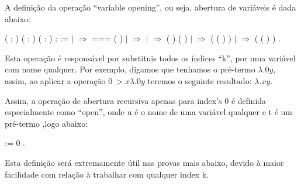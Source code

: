 A definição da operação ``variable opening'', ou seja, abertura de variáveis é dada abaixo:\begin{coqdoccode}
\coqdocemptyline
\coqdocnoindent
{}  ( : ) ( : ) ( : ) :  :=\coqdoceol
\coqdocindent{1.00em}
  \coqdoceol
\coqdocindent{1.00em}
\ensuremath{|}      \ensuremath{\Rightarrow}   ===     ( )\coqdoceol
\coqdocindent{1.00em}
\ensuremath{|}      \ensuremath{\Rightarrow}  \coqdoceol
\coqdocindent{1.00em}
\ensuremath{|}    \ensuremath{\Rightarrow}  (   ) (   )\coqdoceol
\coqdocindent{1.00em}
\ensuremath{|}      \ensuremath{\Rightarrow}  ( ( )  )\coqdoceol
\coqdocindent{1.00em}
\ensuremath{|}      \ensuremath{\Rightarrow}  ( ( )  )\coqdoceol
\coqdocindent{1.00em}
.\coqdoceol
\coqdocemptyline
\end{coqdoccode}
Esta operação é responsável por substituis todos os índices ``k'', por uma variável com
nome qualquer. Por exemplo, digamos que tenhamos o pré-termo $\lambda.0 y$, assim, ao aplicar
a operação $ {0 ~> x} \lambda.0 y$ teremos o seguinte resultado: $\lambda.x y$.

 Assim, a operação de abertura recursiva apenas para index's 0 é definida especialmente 
como ``open'', onde u é o nome de uma variável qualquer e t é um pré-termo ,logo abaixo:\begin{coqdoccode}
\coqdocemptyline
\coqdocnoindent
{}    :=  0  .\coqdoceol
\coqdocemptyline
\end{coqdoccode}
Esta definição será extremamente útil nas provas mais abaixo, devido à maior facilidade com relação
à trabalhar com qualquer index k.

